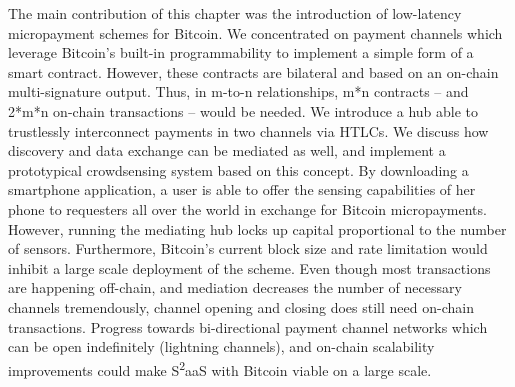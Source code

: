 The main contribution of this chapter was the introduction of low-latency micropayment schemes for Bitcoin. We concentrated on payment channels which leverage Bitcoin's built-in programmability to implement a simple form of a smart contract. However, these contracts are bilateral and based on an on-chain multi-signature output. Thus, in m-to-n relationships, m*n contracts -- and 2*m*n on-chain transactions -- would be needed. We introduce a hub able to trustlessly interconnect payments in two channels via \ac{HTLC}s. We discuss how discovery and data exchange can be mediated as well, and implement a prototypical crowdsensing system based on this concept. By downloading a smartphone application, a user is able to offer the sensing capabilities of her phone to requesters all over the world in exchange for Bitcoin micropayments. However, running the mediating hub locks up capital proportional to the number of sensors. Furthermore, Bitcoin's current block size and rate limitation would inhibit a large scale deployment of the scheme. Even though most transactions are happening off-chain, and mediation decreases the number of necessary channels tremendously, channel opening and closing does still need on-chain transactions. Progress towards bi-directional payment channel networks which can be open indefinitely (lightning channels), and on-chain scalability improvements could make S\textsuperscript{2}aaS with Bitcoin viable on a large scale. 




